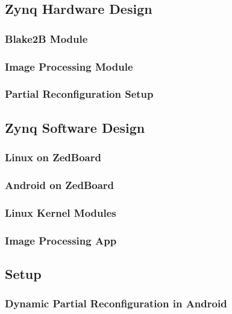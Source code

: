 \subsection{Zynq Hardware Design}\label{ssec:zynqhardwaredesign}

\subsubsection{Blake2B Module}\label{sssec:blake2bmodule}

\subsubsection{Image Processing Module}\label{sssec:imageprocessingmodule}

\subsubsection{Partial Reconfiguration Setup}\label{sssec:partialreconfigurationsetup}

\subsection{Zynq Software Design}\label{ssec:zynqsoftwaredesign}

\subsubsection{Linux on ZedBoard}\label{sssec:linuxonzedboard}

\subsubsection{Android on ZedBoard}\label{sssec:androidonzedboard}

\subsubsection{Linux Kernel Modules}\label{sssec:linuxkernelmodules}

\subsubsection{Image Processing App}\label{sssec:imageprocessingapp}

\subsection{Setup}\label{ssec:setup}

\subsubsection{Dynamic Partial Reconfiguration in Android}\label{sssec:dynamicpartialreconfiguration}

